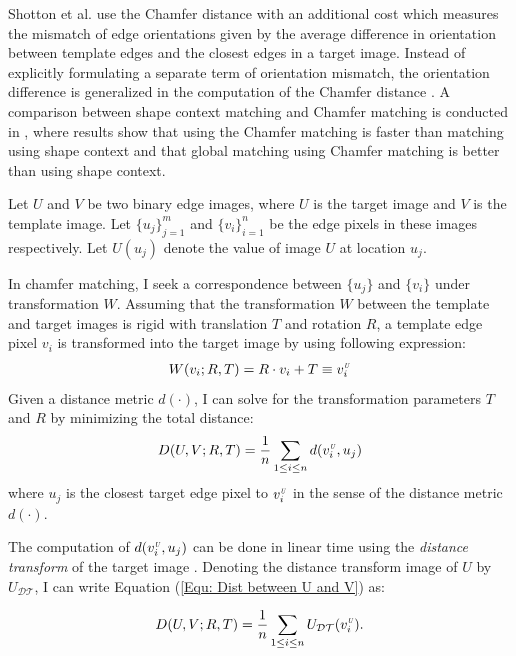 \documentclass{iitthesis}
\begin{document}
Shotton et al.\cite{JS:08} use the Chamfer distance with an additional cost which measures the mismatch of edge orientations given by the average difference in orientation between template edges and the closest edges in a target image. Instead of explicitly formulating a separate term of orientation mismatch, the orientation difference is generalized in the computation of the Chamfer distance \cite{ML:10}. A comparison between shape context matching and Chamfer matching is conducted in \cite{AT:03}, where results show that using the Chamfer matching is faster than matching using shape context and that global matching using Chamfer matching is better than using shape context.

 Let $U$ and $V$ be two binary edge images, where $U$ is the target image and $V$ is the template image. Let $\{u_j\}_{j=1}^m$ and $\{v_i\}_{i=1}^n$ be the edge pixels in these images respectively. Let $U(u_j)$ denote the value of image $U$ at location $u_j$.

In chamfer matching, I seek a correspondence between $\{u_j\}$ and $\{v_i\}$ under transformation $W$. Assuming that the transformation $W$ between the template and target images is rigid with translation $T$ and rotation $R$, a template edge pixel $v_i$ is transformed into the target image by using following expression:
\begin{equation}
W(v_i;R, T)=R \cdot v_i + T \equiv v_i^{\scalebox{.5}{\textit{U}}}
\end{equation}
Given a distance metric $d(\cdot)$, I can solve for the transformation parameters $T$ and $R$ by minimizing the total distance:
\begin{equation}
D(U, V;R, T)=\frac{1}{n}\sum_{1\leq i\leq n}d(v_i^{\scalebox{.5}{\textit{U}}}, u_j)
\label{Equ: Dist between U and V}
\end{equation}
where $u_j$ is the closest target edge pixel to $v_i^{\scalebox{.5}{\textit{U}}}$ in the sense of the distance metric $d(\cdot)$.

The computation of $d(v_i^{\scalebox{.5}{\textit{U}}}, u_j)$ can be done in linear time using the \textit{distance transform} of the target image \cite{AR:66}. Denoting the distance transform image of $U$ by $U_{\mathcal{DT}}$, I can write Equation (\ref{Equ: Dist between U and V}) as:

\begin{equation}
D(U, V;R, T)=\frac{1}{n}\sum_{1\leq i\leq n}U_{\mathcal{DT}}(v_i^{\scalebox{.5}{\textit{U}}}).
\label{Equ: Dist between U and V 2}
\end{equation}
\end{document}
